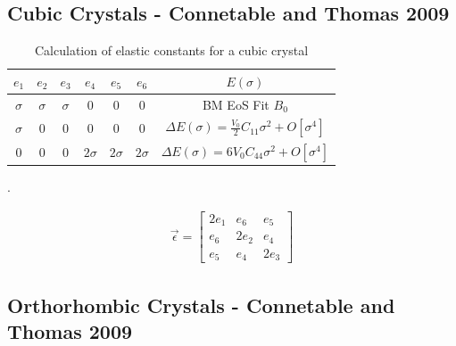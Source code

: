 \FloatBarrier
\subsection{Cubic Crystals - Connetable and Thomas 2009}

\renewcommand{\arraystretch}{1.7}
\begin{table}[!htbp]
\centering
\begin{tabular}{c c c c c c c}
\hline\hline
$e_1$ & $e_2$ & $e_3$ & $e_4$ & $e_5$ & $e_6$ & $E(\sigma)$ \\
\hline\hline
$\sigma$ & $\sigma$ & $\sigma$ & 0 & 0 & 0 & BM EoS Fit $B_0$\\

$\sigma$ & 0 & 0& 0 & 0 & 0 & $\Delta E(\sigma) = \frac{V_{0}}{2} C_{11} \sigma^2 + O[\sigma^4]$ \\

0 & 0 & 0& $2 \sigma$ & $2 \sigma$ & $2 \sigma$ & $\Delta E(\sigma) = 6 V_{0} C_{44} \sigma^2 + O[\sigma^4]$ \\
\end{tabular}
\label{tab:ctcubic}
\caption{Calculation of elastic constants for a cubic crystal\cite{orthonisi}}.
\end{table}


\begin{equation}
\begin{split}
\vec{\epsilon} = \begin{bmatrix} 2 e_1 & e_6 & e_5 \\ e_6 & 2 e_2 & e_4 \\ e_5 & e_4 & 2 e_3 \end{bmatrix}
\end{split}
\label{eq:eqStrainMatrixCT}
\end{equation}









\FloatBarrier
\subsection{Orthorhombic Crystals - Connetable and Thomas 2009}

